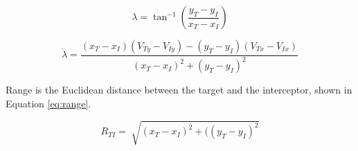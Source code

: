 \documentclass[conference]{IEEEtran}
\begin{document}


\begin{equation} \label{eq:LOS}
\lambda = \tan^{-1} \left(\frac{y_T - y_I}{x_T - x_I}\right)
\end{equation} 

\begin{equation} \label{eq:losrate}
\dot{\lambda} = \frac{(x_T - x_I)(V_{Ty}-V_{Iy}) - (y_T - y_I)(V_{Tx}-V_{Ix})}{(x_T - x_I)^2+(y_T - y_I)^2}
\end{equation}



%

Range is the Euclidean distance between the target and the interceptor, shown in Equation \ref{eq:range}. 

\begin{equation} \label{eq:range}
R_{TI} =\sqrt[]{(x_T - x_I)^2+((y_T - y_I)^2}
\end{equation}





\end{document}
